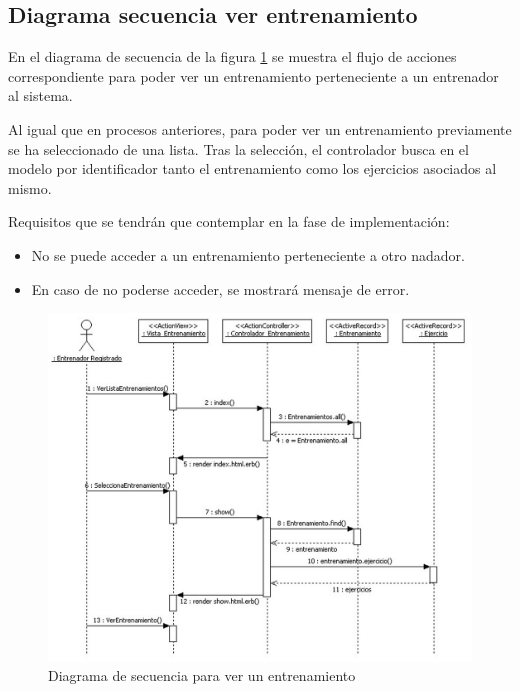 		  \newpage
		
		\subsection{Diagrama secuencia ver entrenamiento} %
		  \label{sub:diagrama_secuencia_ver_entrenamiento}
		  
		  En el diagrama de secuencia de la figura \ref{fig:di_sec_verentrenamiento} se muestra el flujo de acciones correspondiente para poder ver un entrenamiento perteneciente a un entrenador al sistema.
		  
		  Al igual que en procesos anteriores, para poder ver un entrenamiento previamente se ha seleccionado de una lista. Tras la selección, el controlador busca en el modelo por identificador tanto el entrenamiento como los ejercicios asociados al mismo.
		  
		  Requisitos que se tendrán que contemplar en la fase de implementación:
			
			\begin{itemize}
			 \item No se puede acceder a un entrenamiento perteneciente a otro nadador.
			 \item En caso de no poderse acceder, se mostrará mensaje de error.
			\end{itemize}
			
		  \begin{figure}[H]
			  \centering
			    \includegraphics[width=15cm]{./eps/di_diagsecuencia/Entrenamiento_Ver.eps}
			  \caption{Diagrama de secuencia para ver un entrenamiento}
			  \label{fig:di_sec_verentrenamiento}
			\end{figure}
		
